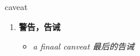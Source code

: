 
\begin{frame}
{\huge caveat}
\begin{center}
\begin{enumerate}\Large
  \item \textbf{警告，告诫}
  \begin{itemize}
    \item \em{\Large{a finaal canveat 最后的告诫}}
  \end{itemize}
\end{enumerate}
\end{center}
\end{frame}

